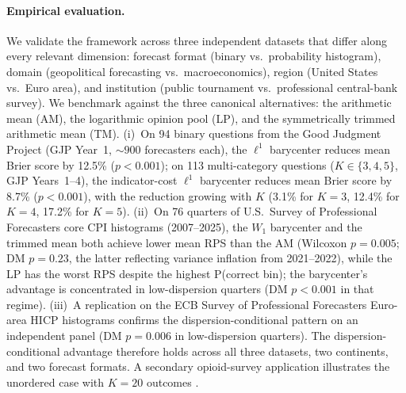 \paragraph{Empirical evaluation.}  We validate the framework across three independent datasets that differ along every relevant dimension: forecast format (binary vs.\ probability histogram), domain (geopolitical forecasting vs.\ macroeconomics), region (United States vs.\ Euro area), and institution (public tournament vs.\ professional central-bank survey).  We benchmark against the three canonical alternatives: the arithmetic mean (AM), the logarithmic opinion pool (LP), and the symmetrically trimmed arithmetic mean (TM).  (i)~On 94 binary questions from the Good Judgment Project (GJP Year~1, $\sim\!900$ forecasters each), the $\ell^1$ barycenter reduces mean Brier score by 12.5\% ($p < 0.001$); on 113 multi-category questions ($K\in\{3,4,5\}$, GJP Years~1--4), the indicator-cost $\ell^1$ barycenter reduces mean Brier score by 8.7\% ($p < 0.001$), with the reduction growing with $K$ (3.1\% for $K=3$, 12.4\% for $K=4$, 17.2\% for $K=5$).  (ii)~On 76 quarters of U.S.\ Survey of Professional Forecasters core CPI histograms (2007--2025), the $W_1$ barycenter and the trimmed mean both achieve lower mean RPS than the AM (Wilcoxon $p = 0.005$; DM $p = 0.23$, the latter reflecting variance inflation from 2021--2022), while the LP has the worst RPS despite the highest P(correct bin); the barycenter's advantage is concentrated in low-dispersion quarters (DM $p < 0.001$ in that regime).  (iii)~A replication on the ECB Survey of Professional Forecasters Euro-area HICP histograms confirms the dispersion-conditional pattern on an independent panel (DM $p = 0.006$ in low-dispersion quarters).  The dispersion-conditional advantage therefore holds across all three datasets, two continents, and two forecast formats.  A secondary opioid-survey application illustrates the unordered case with $K=20$ outcomes \cite{mcandrew21}.

